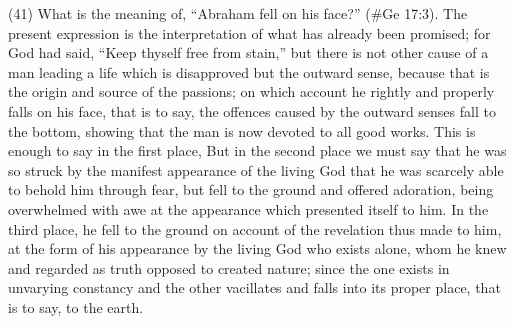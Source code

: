 (41) What is the meaning of, ``Abraham fell on his face?'' (\#Ge 17:3). The present expression
is the interpretation of what has already been promised; for God had said, ``Keep thyself free from
stain,'' but there is not other cause of a man leading a life which is disapproved but the outward
sense, because that is the origin and source of the passions; on which account he rightly and
properly falls on his face, that is to say, the offences caused by the outward senses fall to the
bottom, showing that the man is now devoted to all good works. This is enough to say in the first
place, But in the second place we must say that he was so struck by the manifest appearance of
the living God that he was scarcely able to behold him through fear, but fell to the ground and
offered adoration, being overwhelmed with awe at the appearance which presented itself to him. In
the third place, he fell to the ground on account of the revelation thus made to him, at the form of
his appearance by the living God who exists alone, whom he knew and regarded as truth opposed
to created nature; since the one exists in unvarying constancy and the other vacillates and falls
into its proper place, that is to say, to the earth.

